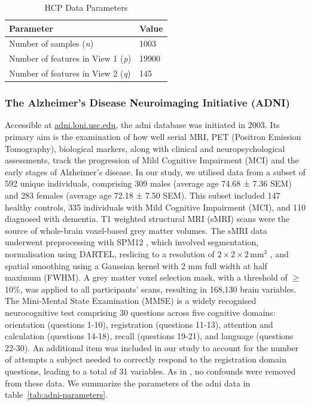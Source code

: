 \begin{table}
    \centering
    \caption{HCP Data Parameters}
    \begin{tabular}{| l | l |}
        \hline
        \textbf{Parameter}                        & \textbf{Value} \\
        \hline
        Number of samples (\textit{n})            & 1003           \\
        Number of features in View 1 (\textit{p}) & 19900          \\
        Number of features in View 2 (\textit{q}) & 145            \\
        \hline
    \end{tabular}\label{tab:hcp-parameters}
\end{table}

\subsubsection{The Alzheimer's Disease Neuroimaging Initiative (ADNI)}

Accessible at \url{adni.loni.usc.edu}, the \acrshort{adni} database was initiated in 2003. 
Its primary aim is the examination of how well serial MRI, PET (Positron Emission Tomography), biological markers, along with clinical and neuropsychological assessments, track the progression of Mild Cognitive Impairment (MCI) and the early stages of Alzheimer’s disease. 
In our study, we utilised data from a subset of 592 unique individuals, comprising 309 males (average age 74.68 ± 7.36 SEM) and 283 females (average age 72.18 ± 7.50 SEM). This subset included 147 healthy controls, 335 individuals with Mild Cognitive Impairment (MCI), and 110 diagnosed with dementia. 
T1 weighted structural MRI (sMRI) scans were the source of whole-brain voxel-based grey matter volumes. The sMRI data underwent preprocessing with SPM12 \citep{ashburner2014spm12}, which involved segmentation, normalisation using DARTEL, reslicing to a resolution of \(2 \times 2 \times 2 \, \text{mm}^3\)
, and spatial smoothing using a Gaussian kernel with 2 mm full width at half maximum (FWHM). A grey matter voxel selection mask, with a threshold of $\geq$10\%, was applied to all participants' scans, resulting in 168,130 brain variables. 
The Mini-Mental State Examination (MMSE) is a widely recognised neurocognitive test comprising 30 questions across five cognitive domains\citep{folstein1975mini}: orientation (questions 1-10), registration (questions 11-13), attention and calculation (questions 14-18), recall (questions 19-21), and language (questions 22-30).
An additional item was included in our study to account for the number of attempts a subject needed to correctly respond to the registration domain questions, leading to a total of 31 variables. As in \citet{monteiro2016multiple}, no confounds were removed from these data.
We summarize the parameters of the \acrshort{adni} data in table~\ref{tab:adni-parameters}.

